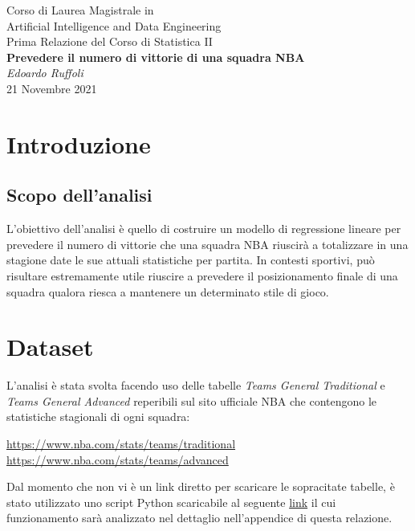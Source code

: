 \documentclass[11pt,a4paper]{article}
\begin{document}
\begin{center}
	\Large{Corso di Laurea Magistrale in \\
	Artificial Intelligence and	Data Engineering}\\
	\vspace{0.2cm}
	\large{Prima Relazione del Corso di Statistica II}\\
	\vspace{0.5cm}
	\Large\textbf{Prevedere il numero di vittorie di una squadra NBA}\\
	\vspace{0.5cm}
	\large\emph{Edoardo Ruffoli}\\
	\vspace{0.5cm}
	\normalsize{21 Novembre 2021}
\end{center}

\tableofcontents
\newpage

\section{Introduzione}
\subsection{Scopo dell'analisi}
L'obiettivo dell'analisi è quello di costruire un modello di regressione lineare per prevedere il numero di vittorie che una squadra NBA riuscirà a totalizzare in una stagione date le sue attuali statistiche per partita. 
In contesti sportivi, può risultare estremamente utile riuscire a prevedere il posizionamento finale di una squadra qualora riesca a mantenere un determinato stile di gioco. 

\section{Dataset}
L'analisi è stata svolta facendo uso delle tabelle \emph{Teams General Traditional} e \emph{Teams General Advanced} reperibili sul sito ufficiale NBA che contengono le statistiche stagionali di ogni squadra:
\begin{center}
    \url{https://www.nba.com/stats/teams/traditional}\\
    \url{https://www.nba.com/stats/teams/advanced}\\
\end{center}
Dal momento che non vi è un link diretto per scaricare le sopracitate tabelle, è stato utilizzato uno script Python scaricabile al seguente \href{https://github.com/edoardoruffoli/Statistics/blob/master/FirstProject/nba_stats_scraper.py}{link} il cui funzionamento sarà analizzato nel dettaglio nell'appendice di questa relazione.
\end{document}

